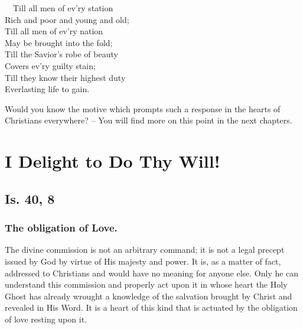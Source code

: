 \documentclass[
]{book}
\begin{document}
~~Till all men of ev'ry station\\
\hspace*{0.333em}\hspace*{0.333em}Rich and poor and young and old;\\
\hspace*{0.333em}\hspace*{0.333em}Till all men of ev'ry nation\\
\hspace*{0.333em}\hspace*{0.333em}May be brought into the fold;\\
\hspace*{0.333em}\hspace*{0.333em}Till the Savior's robe of beauty\\
\hspace*{0.333em}\hspace*{0.333em}Covers ev'ry guilty stain;\\
\hspace*{0.333em}\hspace*{0.333em}Till they know their highest duty\\
\hspace*{0.333em}\hspace*{0.333em}Everlasting life to gain.

Would you know the motive which prompts such a response in the hearts of Christians everywhere? -- You will find more on this point in the next chapters.

\chapter{I Delight to Do Thy Will!}\label{i-delight-to-do-thy-will}

\section*{Is. 40, 8}\label{is.-40-8}

\subsection*{The obligation of Love.}\label{the-obligation-of-love.}

The divine commission is not an arbitrary command; it is not a legal precept issued by God by virtue of His majesty and power. It is, as a matter of fact, addressed to Christians and would have no meaning for anyone else. Only he can understand this commission and properly act upon it in whose heart the Holy Ghost has already wrought a knowledge of the salvation brought by Christ and revealed in His Word. It is a heart of this kind that is actuated by the obligation of love resting upon it.
\end{document}
